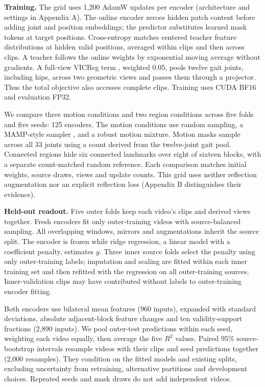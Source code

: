 \documentclass{article}
\begin{document}
\textbf{Training.} The grid uses 1,200 AdamW updates per encoder
(architecture and settings in Appendix A). The online encoder zeroes
hidden patch content before adding joint and position embeddings; the
predictor substitutes learned mask tokens at target positions.
Cross-entropy matches centered teacher feature distributions at hidden
valid positions, averaged within clips and then across clips. A teacher
follows the online weights by exponential moving average without
gradients. A full-view VICReg term \citep{vicreg}, weighted 0.05, pools
twelve gait joints, including hips, across two geometric views and
passes them through a projector. Thus the total objective also accesses
complete clips. Training uses CUDA BF16 and evaluation FP32.

We compare three motion conditions and two region conditions across five
folds and five seeds: 125 encoders. The motion conditions use random
sampling, a MAMP-style sampler \citep{mamp}, and a robust motion
mixture. Motion masks sample across all 33 joints using a count derived
from the twelve-joint gait pool. Connected regions hide six connected
landmarks over eight of sixteen blocks, with a separate count-matched
random reference. Each comparison matches initial weights, source draws,
views and update counts. This grid uses neither reflection augmentation
nor an explicit reflection loss (Appendix B distinguishes their
evidence).

\textbf{Held-out readout.} Five outer folds keep each video's clips and
derived views together. Fresh encoders fit only outer-training videos
with source-balanced sampling. All overlapping windows, mirrors and
augmentations inherit the source split. The encoder is frozen while
ridge regression, a linear model with a coefficient penalty, estimates
\(y\). Three inner source folds select the penalty using only
outer-training labels; imputation and scaling are fitted within each
inner training set and then refitted with the regression on all
outer-training sources. Inner-validation clips may have contributed
without labels to outer-training encoder fitting.

Both encoders use bilateral mean features (960 inputs), expanded with
standard deviations, absolute adjacent-block feature changes and ten
validity-support fractions (2,890 inputs). We pool outer-test
predictions within each seed, weighting each video equally, then average
the five \(R^2\) values. Paired 95\% source-bootstrap intervals resample
videos with their clips and seed predictions together (2,000 resamples).
They condition on the fitted models and existing splits, excluding
uncertainty from retraining, alternative partitions and development
choices. Repeated seeds and mask draws do not add independent videos.
\end{document}
